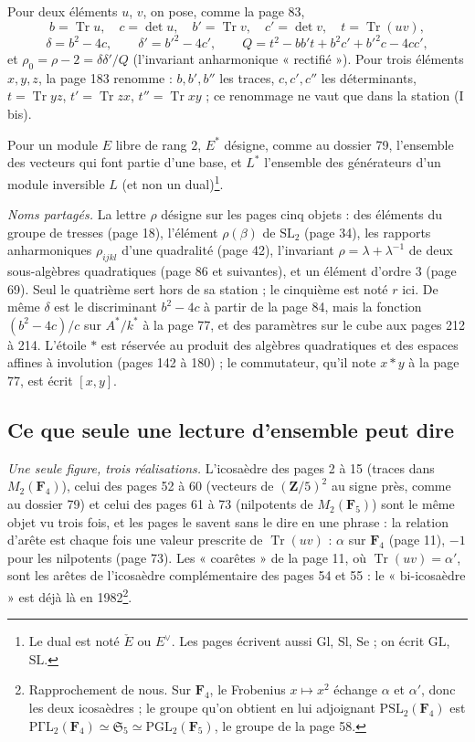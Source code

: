 \documentclass[11pt,a4paper]{article}
\begin{document}
Pour deux éléments $u$, $v$, on pose, comme la page 83,
\[
  b = \operatorname{Tr}u,\quad c = \det u,\quad b' = \operatorname{Tr}v,\quad
  c' = \det v,\quad t = \operatorname{Tr}(uv),
\]
\[
  \delta = b^2 - 4c,\qquad \delta' = b'^2 - 4c',\qquad
  Q = t^2 - bb't + b^2c' + b'^2c - 4cc',
\]
et $\rho_0 = \rho - 2 = \delta\delta'/Q$ (l'invariant anharmonique
« rectifié »). Pour trois éléments $x, y, z$, la page 183 renomme : $b, b',
b''$ les traces, $c, c', c''$ les déterminants, $t = \operatorname{Tr}yz$, $t'
= \operatorname{Tr}zx$, $t'' = \operatorname{Tr}xy$ ; ce renommage ne vaut que
dans la station (I bis).

Pour un module $E$ libre de rang $2$, $E^{*}$ désigne, comme au dossier 79,
l'ensemble des vecteurs qui font partie d'une base, et $L^{*}$ l'ensemble des
générateurs d'un module inversible $L$ (et non un dual)\footnote{Le dual est noté
$\check{E}$ ou $E^{\vee}$. Les pages écrivent aussi $\mathrm{Gl}$, $\mathrm{Sl}$,
$\mathrm{Se}$ ; on écrit $\mathrm{GL}$, $\mathrm{SL}$.}.

\emph{Noms partagés.} La lettre $\rho$ désigne sur les pages cinq objets :
des éléments du groupe de tresses (page 18), l'élément $\rho(\beta)$ de
$\mathrm{SL}_2$ (page 34), les rapports anharmoniques $\rho_{ijkl}$ d'une
quadralité (page 42), l'invariant $\rho = \lambda + \lambda^{-1}$ de deux
sous-algèbres quadratiques (page 86 et suivantes), et un élément d'ordre $3$
(page 69). Seul le quatrième sert hors de sa station ; le cinquième est noté
$r$ ici. De même $\delta$ est le discriminant $b^2 - 4c$ à partir de la page
84, mais la fonction $(b^2 - 4c)/c$ sur $A^{*}/k^{*}$ à la page 77, et des
paramètres sur le cube aux pages 212 à 214. L'étoile $*$ est réservée au
produit des algèbres quadratiques et des espaces affines à involution (pages
142 à 180) ; le commutateur, qu'il note $x * y$ à la page 77, est écrit
$[x, y]$.

\subsection*{Ce que seule une lecture d'ensemble peut dire}

\emph{Une seule figure, trois réalisations.} L'icosaèdre des pages 2 à 15
(traces dans $M_2(\mathbf{F}_4)$), celui des pages 52 à 60 (vecteurs de
$(\mathbf{Z}/5)^2$ au signe près, comme au dossier 79) et celui des pages 61 à
73 (nilpotents de $M_2(\mathbf{F}_5)$) sont le même objet vu trois fois, et
les pages le savent sans le dire en une phrase : la relation d'arête est
chaque fois une valeur prescrite de $\operatorname{Tr}(uv)$ : $\alpha$ sur
$\mathbf{F}_4$ (page 11), $-1$ pour les nilpotents (page 73). Les
« coarêtes » de la page 11, où $\operatorname{Tr}(uv) = \alpha'$, sont les arêtes
de l'icosaèdre complémentaire des pages 54 et 55 : le « bi-icosaèdre » est déjà
là en 1982\footnote{Rapprochement de nous. Sur $\mathbf{F}_4$, le Frobenius
$x \mapsto x^2$ échange $\alpha$ et $\alpha'$, donc les deux icosaèdres ; le
groupe qu'on obtient en lui adjoignant $\mathrm{PSL}_2(\mathbf{F}_4)$ est
$\mathrm{P\Gamma L}_2(\mathbf{F}_4) \simeq \mathfrak{S}_5 \simeq
\mathrm{PGL}_2(\mathbf{F}_5)$, le groupe de la page 58.}.
\end{document}
